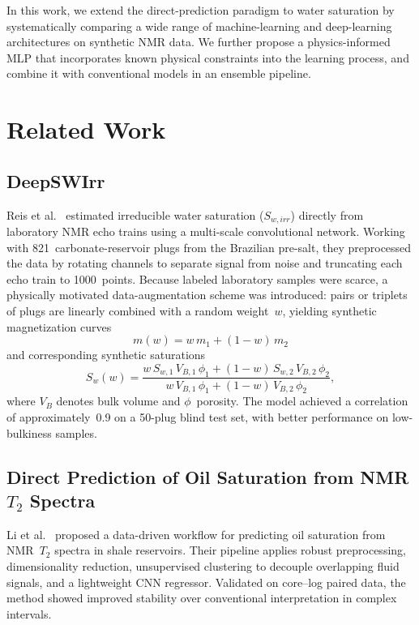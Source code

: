 \documentclass[runningheads]{llncs}
\begin{document}
In this work, we extend the direct-prediction paradigm to water saturation by systematically
comparing a wide range of machine-learning and deep-learning architectures on synthetic NMR data.
We further propose a physics-informed MLP that incorporates known physical constraints into the
learning process, and combine it with conventional models in an ensemble pipeline.

\section{Related Work}
\label{sec:related}

\subsection{DeepSWIrr}
Reis et al.~\cite{ref_deepswirr} estimated irreducible water saturation ($S_{w,irr}$)
directly from laboratory NMR echo trains using a multi-scale convolutional network.
Working with 821~carbonate-reservoir plugs from the Brazilian pre-salt, they preprocessed
the data by rotating channels to separate signal from noise and truncating each echo train
to 1000~points. Because labeled laboratory samples were scarce, a physically motivated
data-augmentation scheme was introduced: pairs or triplets of plugs are linearly combined
with a random weight~$w$, yielding synthetic magnetization curves
\begin{equation}
  m(w) = w\,m_1 + (1-w)\,m_2
  \label{eq:aug_m}
\end{equation}
and corresponding synthetic saturations
\begin{equation}
  S_w(w) =
  \frac{w\,S_{w,1}\,V_{B,1}\,\phi_1 + (1-w)\,S_{w,2}\,V_{B,2}\,\phi_2}
       {w\,V_{B,1}\,\phi_1 + (1-w)\,V_{B,2}\,\phi_2},
  \label{eq:aug_sw}
\end{equation}
where $V_B$ denotes bulk volume and $\phi$~porosity.
The model achieved a correlation of approximately~0.9 on a 50-plug blind test set,
with better performance on low-bulkiness samples.

\subsection{Direct Prediction of Oil Saturation from NMR $T_2$ Spectra}
Li et al.~\cite{ref_li2026} proposed a data-driven workflow for predicting oil saturation
from NMR~$T_2$ spectra in shale reservoirs. Their pipeline applies robust preprocessing,
dimensionality reduction, unsupervised clustering to decouple overlapping fluid signals,
and a lightweight CNN regressor. Validated on core--log paired data, the method showed
improved stability over conventional interpretation in complex intervals.
\end{document}
